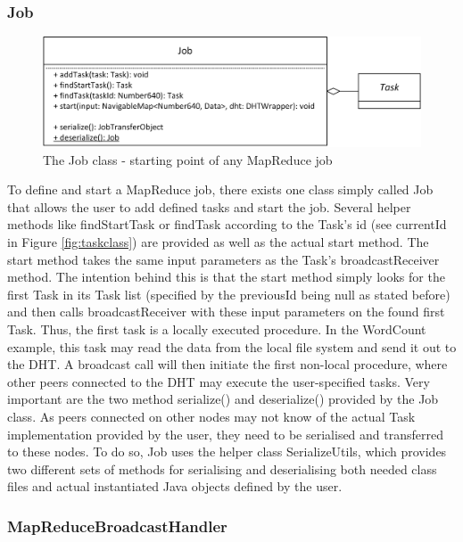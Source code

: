\subsubsection{Job}
\begin{figure}
	\centering	
	\includegraphics{imgs/jobtask}
	\caption{The Job class - starting point of any MapReduce job}	
	\label{fig:jobtask}
\end{figure} 
To define and start a MapReduce job, there exists one class simply called Job that allows the user to add defined tasks and start the job. Several helper methods like findStartTask or findTask according to the Task's id (see currentId in Figure \ref{fig:taskclass}) are provided as well as the actual start method. The start method takes the same input parameters as the Task's broadcastReceiver method. The intention behind this is that the start method simply looks for the first Task in its Task list (specified by the previousId being null as stated before) and then calls broadcastReceiver with these input parameters on the found first Task. Thus, the first task is a locally executed procedure. In the WordCount example, this task may read the data from the local file system and send it out to the DHT. A broadcast call will then initiate the first non-local procedure, where other peers connected to the DHT may execute the user-specified tasks. Very important are the two method serialize() and deserialize() provided by the Job class. As peers connected on other nodes may not know of the actual Task implementation provided by the user, they need to be serialised and transferred to these nodes. To do so, Job uses the helper class SerializeUtils, which provides two different sets of methods for serialising and deserialising both needed class files and actual instantiated Java objects defined by the user. 


\subsubsection{MapReduceBroadcastHandler}

